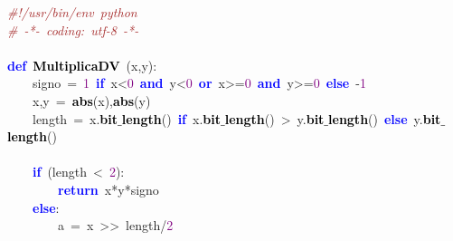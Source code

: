 \noindent
\mbox{}\textit{\textcolor{Brown}{\#!/usr/bin/env\ python}} \\
\mbox{}\textit{\textcolor{Brown}{\#\ -*-\ coding:\ utf-8\ -*-}} \\
\mbox{} \\
\mbox{}\textbf{\textcolor{Blue}{def}}\ \textbf{\textcolor{Black}{MultiplicaDV}}\ \textcolor{BrickRed}{(}x\textcolor{BrickRed}{,}y\textcolor{BrickRed}{):} \\
\mbox{}\ \ \ \ signo\ \textcolor{BrickRed}{=}\ \textcolor{Purple}{1}\ \textbf{\textcolor{Blue}{if}}\ x\textcolor{BrickRed}{\textless{}}\textcolor{Purple}{0}\ \textbf{\textcolor{Blue}{and}}\ y\textcolor{BrickRed}{\textless{}}\textcolor{Purple}{0}\ \textbf{\textcolor{Blue}{or}}\ x\textcolor{BrickRed}{\textgreater{}=}\textcolor{Purple}{0}\ \textbf{\textcolor{Blue}{and}}\ y\textcolor{BrickRed}{\textgreater{}=}\textcolor{Purple}{0}\ \textbf{\textcolor{Blue}{else}}\ \textcolor{BrickRed}{-}\textcolor{Purple}{1} \\
\mbox{}\ \ \ \ x\textcolor{BrickRed}{,}y\ \textcolor{BrickRed}{=}\ \textbf{\textcolor{Black}{abs}}\textcolor{BrickRed}{(}x\textcolor{BrickRed}{),}\textbf{\textcolor{Black}{abs}}\textcolor{BrickRed}{(}y\textcolor{BrickRed}{)} \\
\mbox{}\ \ \ \ length\ \textcolor{BrickRed}{=}\ x\textcolor{BrickRed}{.}\textbf{\textcolor{Black}{bit$\_$length}}\textcolor{BrickRed}{()}\ \textbf{\textcolor{Blue}{if}}\ x\textcolor{BrickRed}{.}\textbf{\textcolor{Black}{bit$\_$length}}\textcolor{BrickRed}{()}\ \textcolor{BrickRed}{\textgreater{}}\ y\textcolor{BrickRed}{.}\textbf{\textcolor{Black}{bit$\_$length}}\textcolor{BrickRed}{()}\ \textbf{\textcolor{Blue}{else}}\ y\textcolor{BrickRed}{.}\textbf{\textcolor{Black}{bit$\_$length}}\textcolor{BrickRed}{()} \\
\mbox{} \\
\mbox{}\ \ \ \ \textbf{\textcolor{Blue}{if}}\ \textcolor{BrickRed}{(}length\ \textcolor{BrickRed}{\textless{}}\ \textcolor{Purple}{2}\textcolor{BrickRed}{):} \\
\mbox{}\ \ \ \ \ \ \ \ \textbf{\textcolor{Blue}{return}}\ x\textcolor{BrickRed}{*}y\textcolor{BrickRed}{*}signo \\
\mbox{}\ \ \ \ \textbf{\textcolor{Blue}{else}}\textcolor{BrickRed}{:} \\
\mbox{}\ \ \ \ \ \ \ \ a\ \textcolor{BrickRed}{=}\ x\ \textcolor{BrickRed}{\textgreater{}\textgreater{}}\ length\textcolor{BrickRed}{/}\textcolor{Purple}{2} \\
